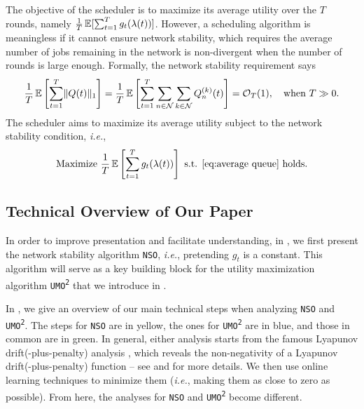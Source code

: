 \documentclass[11pt,fullpage,letterpaper]{article} %
\renewcommand{\bm}[1]{#1}%
\renewcommand{\O}{\operatorname{\mathcal O}}
\newcommand{\E}{\operatornamewithlimits{\mathbb{E}}}
\newcommand{\mN}{{\mathcal N}}
\newcommand{\SSAlg}{\texttt{NSO}\xspace}
\newcommand{\UMAlg}{\texttt{UMO}\textsuperscript{\texttt{2}}\xspace}
\begin{document}
The objective of the scheduler is to maximize its average utility over the $T$ rounds, namely $\frac 1T \E[\sum_{t=1}^T g_t(\bm \lambda(t))]$.
However, a scheduling algorithm is meaningless if it cannot ensure network stability, which requires the average number of jobs remaining in the network is non-divergent when the number of rounds is large enough.
Formally, the network stability requirement says
\begin{equation}
\frac 1T \E\left [\sum_{t=1}^T \lVert \bm Q(t)\rVert_1\right ]=\frac 1T\E\left [\sum_{t=1}^T \sum_{n\in \mN} \sum_{k\in \mN} Q_{n}^{(k)}(t)\right ]=\O_T(1),\quad \text{when }T\gg 0.\label{eq:average queue}
\end{equation}
The scheduler aims to maximize its average utility subject to the network stability condition, \textit{i.e.},
\begin{equation}\label{eq:average reward}
\text{Maximize }\frac 1T \E\left [\sum_{t=1}^T g_t(\bm \lambda(t))\right ]\text{ s.t. \Cref{eq:average queue} holds}.
\end{equation}

\subsection{Technical Overview of Our Paper}
In order to improve presentation and facilitate understanding, in , we first present the network stability algorithm \SSAlg, \textit{i.e.}, pretending $g_t$ is a constant. This algorithm will serve as a key building block for the utility maximization algorithm \UMAlg that we introduce in .

In , we give an overview of our main technical steps when analyzing \SSAlg and \UMAlg. The steps for \SSAlg are in yellow, the ones for \UMAlg are in blue, and those in common are in green.
In general, either analysis starts from the famous Lyapunov drift(-plus-penalty) analysis \citep[\S 4]{neely2010stochastic}, which reveals the non-negativity of a Lyapunov drift(-plus-penalty) function -- see  and  for more details.
We then use online learning techniques to minimize them (\textit{i.e.}, making them as close to zero as possible). From here, the analyses for \SSAlg and \UMAlg become different.


\begin{figure}[omitted: a diagram of this paper's results, not reproduced here]\label{fig:flowchart}\end{figure}
\end{document}
